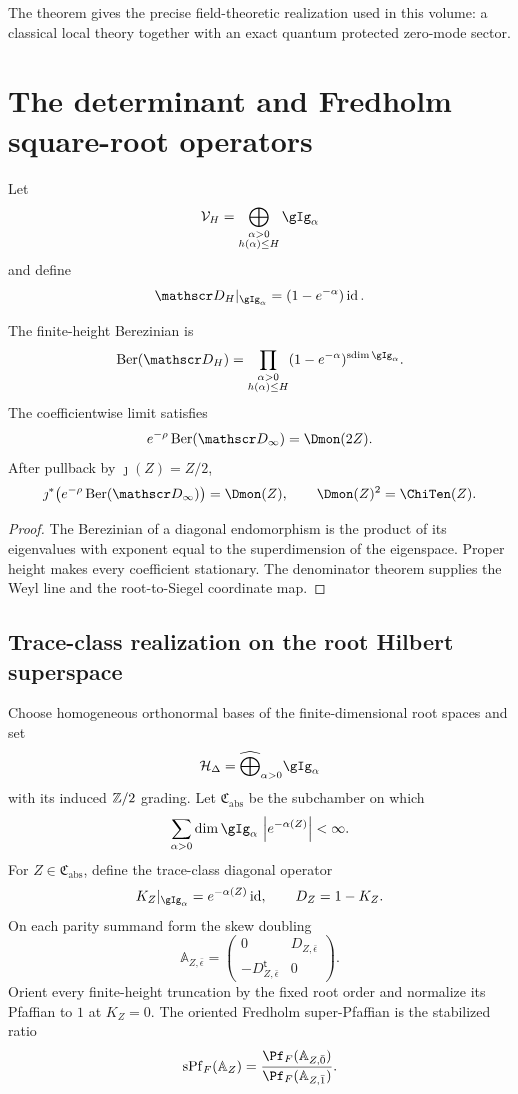 The theorem gives the precise field-theoretic realization used in this volume: a classical local theory together with an exact quantum protected zero-mode sector.

\chapter{The determinant and Fredholm square-root operators}
Let
\[
 \Vcal_H=\bigoplus_{\substack{\alpha>0\\h(\alpha)\le H}}\gIg_\alpha
\]
and define
\[
 \mathscr D_H|_{\gIg_\alpha}=(1-e^{-\alpha})\id.
\]

\begin{theorem}
The finite-height Berezinian is
\[
 \Ber(\mathscr D_H)
 =\prod_{\substack{\alpha>0\\h(\alpha)\le H}}
 (1-e^{-\alpha})^{\sdim\gIg_\alpha}.
\]
The coefficientwise limit satisfies
\[
 e^{-\rho}\Ber(\mathscr D_\infty)=\Dmon(2Z).
\]
After pullback by $\jmath(Z)=Z/2$,
\[
 \jmath^*\!\left(e^{-\rho}\Ber(\mathscr D_\infty)\right)=\Dmon(Z),
 \qquad \Dmon(Z)^2=\ChiTen(Z).
\]
\end{theorem}
\begin{proof}
The Berezinian of a diagonal endomorphism is the product of its eigenvalues with exponent equal to the superdimension of the eigenspace.  Proper height makes every coefficient stationary.  The denominator theorem supplies the Weyl line and the root-to-Siegel coordinate map.
\end{proof}

\section{Trace-class realization on the root Hilbert superspace}
Choose homogeneous orthonormal bases of the finite-dimensional root spaces and set
\[
 \Hcal_{\Delta}=\widehat\bigoplus_{\alpha>0}\gIg_\alpha
\]
with its induced $\mathbb Z/2$ grading.  Let $\mathfrak C_{\mathrm{abs}}$ be the subchamber on which
\[
 \sum_{\alpha>0}\dim\gIg_\alpha\,
       \abs{e^{-\alpha(Z)}}<\infty.
\]
For $Z\in\mathfrak C_{\mathrm{abs}}$, define the trace-class diagonal operator
\[
 K_Z|_{\gIg_\alpha}=e^{-\alpha(Z)}\id,
 \qquad D_Z=1-K_Z.
\]
On each parity summand form the skew doubling
\[
 \mathbb A_{Z,\bar\epsilon}=
 \begin{pmatrix}0&D_{Z,\bar\epsilon}\\-D_{Z,\bar\epsilon}^{\mathsf t}&0\end{pmatrix}.
\]
Orient every finite-height truncation by the fixed root order and normalize its Pfaffian to $1$ at $K_Z=0$.  The oriented Fredholm super-Pfaffian is the stabilized ratio
\[
 \operatorname{sPf}_{F}(\mathbb A_Z)
 =\frac{\Pf_F(\mathbb A_{Z,\bar0})}
        {\Pf_F(\mathbb A_{Z,\bar1})}.
\]


